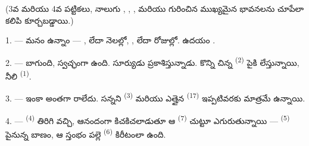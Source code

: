 %

\VUsaut{3.0mm}
\VUsaut{1.6mm}
\VUsaut{3.4mm}

(3వ మరియు 4వ పట్టికలు, నాలుగు  , ,
,  మరియు  గురించిన ముఖ్యమైన భావనలను చూపేలా
కలిపి కూర్చబడ్డాయి.)

\VUsaut{3.0mm}

\VUsaut{2.4mm}

\VUsaut{3.0mm}

1. --- మనం  ఉన్నాం — ,  లేదా 
నెలల్లో,  ,  లేదా  రోజుల్లో.
ఉదయం .

2. ---  బాగుంది,  స్వచ్ఛంగా ఉంది. సూర్యుడు ప్రకాశిస్తున్నాడు.
కొన్ని చిన్న  \textsuperscript{(2)} పైకి లేస్తున్నాయి, నీలి 
\textsuperscript{(1)}.

3. ---  ఇంకా  అంతగా రాలేదు. సన్నని 
\textsuperscript{(3)} మరియు ఎత్తైన  \textsuperscript{(17)} ఇప్పటివరకు
 మాత్రమే ఉన్నాయి.

4. ---  \textsuperscript{(4)} తిరిగి వచ్చి, ఆనందంగా కిచకిచలాడుతూ ఆ
 \textsuperscript{(7)} చుట్టూ ఎగురుతున్నాయి — 
\textsuperscript{(5)} పైనున్న బాణం, ఆ స్తంభం పల్లె  \textsuperscript{(6)}
కిరీటంలా ఉంది.

